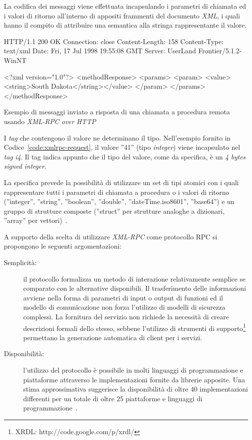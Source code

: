La codifica dei messaggi viene effettuata incapsulando i parametri di chiamata ed i valori di ritorno all'interno di appositi frammenti del documento \emph{XML}, i quali hanno il compito di attribuire una semantica alla stringa rappresentante il valore.

\begin{program}
\begin{verbatimtab}
HTTP/1.1 200 OK
Connection: close
Content-Length: 158
Content-Type: text/xml
Date: Fri, 17 Jul 1998 19:55:08 GMT
Server: UserLand Frontier/5.1.2-WinNT


<?xml version="1.0"?>
<methodResponse>
   <params>
      <param>
         <value><string>South Dakota</string></value>
         </param>
      </params>
   </methodResponse>
\end{verbatimtab}
\caption{Esempio di messaggi inviato a risposta di una chiamata a procedura remota usando \emph{XML-RPC over HTTP}}\label{code:xmlrpc-response}
\end{program}

I \emph{tag} che contengono il valore ne determinano il tipo. Nell'esempio fornito in Codice~\ref{code:xmlrpc-request}, il valore ''41'' (tipo \emph{integer}) viene incapsulato nel \emph{tag i4}. Il tag indica appunto che il tipo del valore, come da specifica, è un \emph{4 bytes signed integer}.

La specifica prevede la possibilità di utilizzare un set di tipi atomici con i quali rappresentare tutti i parametri di chiamata a procedura o i valori di ritorno (''integer'', ''string'', ''boolean'', ''double'', ''dateTime.iso8601'', ''base64'') e un gruppo di strutture composte (''struct'' per strutture analoghe a dizionari, ''array'' per vettori)~\cite{xmlrpcspec}.

A supporto della scelta di utilizzare \emph{XML-RPC} come protocollo RPC si propongono le seguenti argomentazioni:
\begin{description}
	\item[Semplicità:] il protocollo formalizza un metodo di interazione relativamente semplice se comparato con le alternative disponibili. Il trasferimento delle informazioni avviene nella forma di parametri di input o output di funzioni ed il modello di comunicazione non forza l'utilizzo di modelli di sicurezza complessi. La fornitura del servizio non richiede la necessità di creare descrizioni formali dello stesso, sebbene l'utilizzo di strumenti di supporto\footnote{XRDL: http://code.google.com/p/xrdl/} permettano la generazione automatica di client per i servizi.
	\item[Disponibilità:] l'utilizzo del protocollo è possibile in molti linguaggi di programmazione e piattaforme attraverso le implementazioni fornite da librerie apposite. Una stima approssimativa suggerisce la disponibilità di oltre 40 implementazioni differenti per un totale di oltre 25 piattaforme e linguaggi di programmazione~\cite{wikipedia-xmlrpc}.
\end{description}

